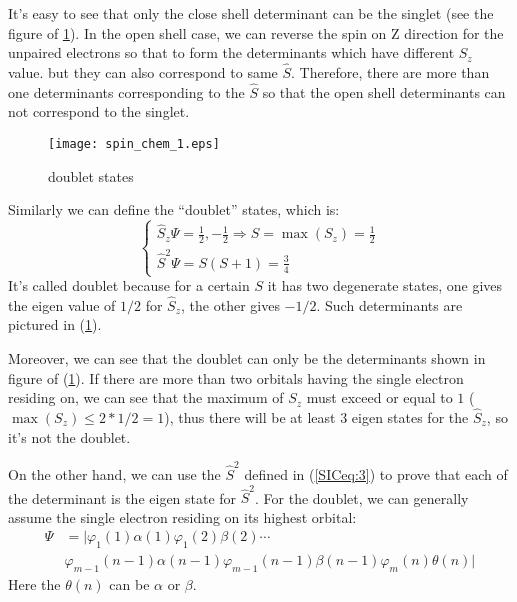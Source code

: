 It's easy to see that only the close shell determinant can be the
singlet (see the figure of \ref{SIC2}). In the open shell case, we
can reverse the spin on Z direction for the unpaired electrons so
that to form the determinants which have different $S_{z}$ value.
but they can also correspond to same $\hat{S}$. Therefore, there are
more than one determinants corresponding to the $\hat{S}$ so that the
open shell determinants can not correspond to the singlet.
\begin{figure}
\begin{center}
\texttt{[image: spin\_chem\_1.eps]}
\caption{doublet states} \label{SIC2}
\end{center}
\end{figure}

Similarly we can define the ``doublet'' states, which is:
\begin{equation}\label{SICeq:5}
\left\{
  \begin{array}{ll}
    \hat{S}_{z}\Psi = \frac{1}{2}, -\frac{1}{2}
    \Rightarrow S = \max(S_{z}) = \frac{1}{2}\\
    \hat{S}^{2}\Psi = S(S+1) = \frac{3}{4}
  \end{array}
\right.
\end{equation}
It's called doublet because for a certain $S$ it has two degenerate
states, one gives the eigen value of $1/2$ for $\hat{S}_{z}$, the
other gives $-1/2$. Such determinants are pictured in (\ref{SIC2}).

Moreover, we can see that the doublet can only be the determinants
shown in figure of (\ref{SIC2}). If there are more than two orbitals
having the single electron residing on, we can see that the maximum
of $S_{z}$ must exceed or equal to $1$ ($\max(S_{z}) \leq 2*1/2 =
1$), thus there will be at least $3$ eigen states for the
$\hat{S}_{z}$, so it's not the doublet.

On the other hand, we can use the $\hat{S}^{2}$ defined in
(\ref{SICeq:3}) to prove that each of the determinant is the eigen
state for $\hat{S}^{2}$. For the doublet, we can generally assume
the single electron residing on its highest orbital:
\begin{align}\label{SICeq:6}
\Psi &= |\varphi_{1}(1)\alpha(1)\varphi_{1}(2)\beta(2) \cdots
\nonumber \\
&\varphi_{m-1}(n-1)\alpha(n-1)\varphi_{m-1}(n-1)\beta(n-1)
\varphi_{m}(n)\theta(n)|
\end{align}
Here the $\theta(n)$ can be $\alpha$ or $\beta$.

